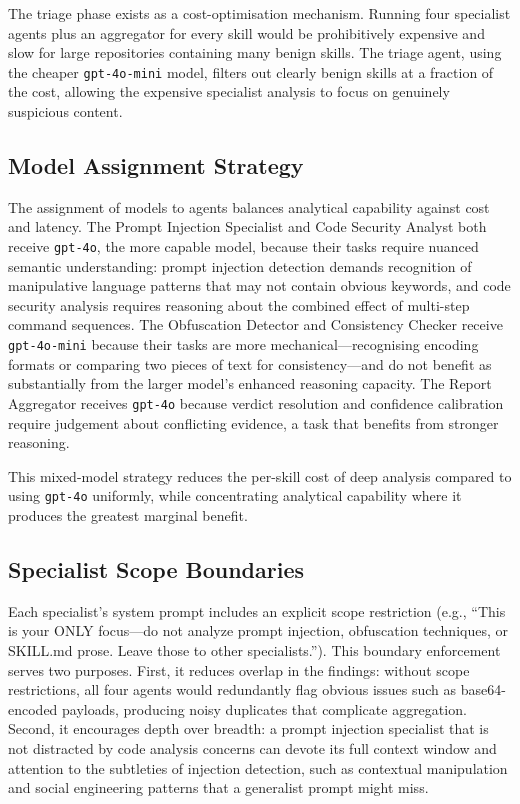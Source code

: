 The triage phase exists as a cost-optimisation mechanism. Running four specialist agents plus an aggregator for every skill would be prohibitively expensive and slow for large repositories containing many benign skills. The triage agent, using the cheaper \texttt{gpt-4o-mini} model, filters out clearly benign skills at a fraction of the cost, allowing the expensive specialist analysis to focus on genuinely suspicious content.

\subsection{Model Assignment Strategy}

The assignment of models to agents balances analytical capability against cost and latency. The Prompt Injection Specialist and Code Security Analyst both receive \texttt{gpt-4o}, the more capable model, because their tasks require nuanced semantic understanding: prompt injection detection demands recognition of manipulative language patterns that may not contain obvious keywords, and code security analysis requires reasoning about the combined effect of multi-step command sequences. The Obfuscation Detector and Consistency Checker receive \texttt{gpt-4o-mini} because their tasks are more mechanical---recognising encoding formats or comparing two pieces of text for consistency---and do not benefit as substantially from the larger model's enhanced reasoning capacity. The Report Aggregator receives \texttt{gpt-4o} because verdict resolution and confidence calibration require judgement about conflicting evidence, a task that benefits from stronger reasoning.

This mixed-model strategy reduces the per-skill cost of deep analysis compared to using \texttt{gpt-4o} uniformly, while concentrating analytical capability where it produces the greatest marginal benefit.

\subsection{Specialist Scope Boundaries}

Each specialist's system prompt includes an explicit scope restriction (e.g., ``This is your ONLY focus---do not analyze prompt injection, obfuscation techniques, or SKILL.md prose. Leave those to other specialists.''). This boundary enforcement serves two purposes. First, it reduces overlap in the findings: without scope restrictions, all four agents would redundantly flag obvious issues such as base64-encoded payloads, producing noisy duplicates that complicate aggregation. Second, it encourages depth over breadth: a prompt injection specialist that is not distracted by code analysis concerns can devote its full context window and attention to the subtleties of injection detection, such as contextual manipulation and social engineering patterns that a generalist prompt might miss.

